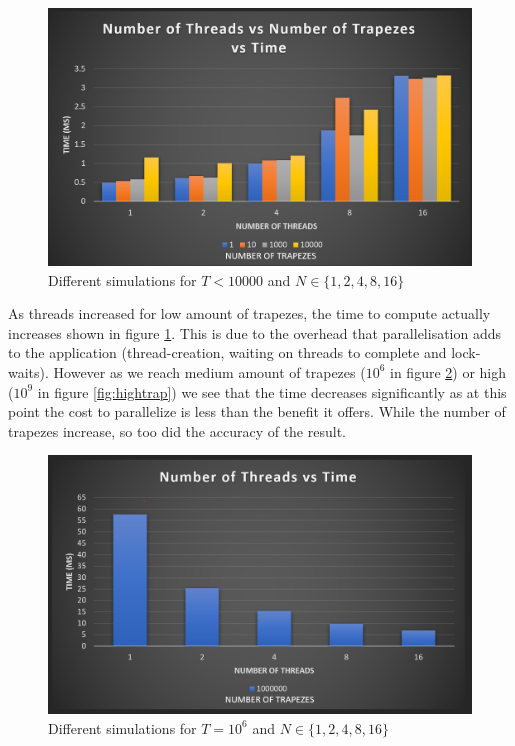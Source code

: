 \begin{figure}
  \centering
  \includegraphics[width=\linewidth]{Figures/lowTrap.png}
  \caption{Different simulations for $T<10000$ and $N \in \{1, 2, 4, 8, 16\}$}
  \label{fig:lowtrap}
\end{figure}

As threads increased for low amount of trapezes, the time to compute actually 
increases shown in figure \ref{fig:lowtrap}. This is due to the overhead that 
parallelisation adds to the application (thread-creation, waiting on threads 
to complete and lock-waits). However as we reach medium amount of trapezes 
($10^6$ in figure \ref{fig:medtrap}) or high ($10^9$ in figure \ref{fig:hightrap}) we see that the time decreases significantly as 
at this point the cost to parallelize is less than the benefit it offers. 
While the number of trapezes increase, so too did the accuracy of the result.

\begin{figure}
  \centering
  \includegraphics[width=\linewidth]{Figures/medTrap.png}
  \caption{Different simulations for $T=10^6$ and $N \in \{1, 2, 4, 8, 16\}$}
  \label{fig:medtrap}
\end{figure}

